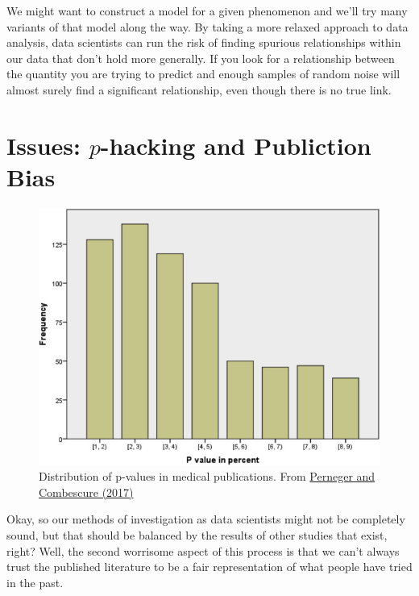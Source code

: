 \documentclass[
  12pt,
]{book}
\begin{document}
We might want to construct a model for a given phenomenon and we'll try many variants of that model along the way. By taking a more relaxed approach to data analysis, data scientists can run the risk of finding spurious relationships within our data that don't hold more generally. If you look for a relationship between the quantity you are trying to predict and enough samples of random noise will almost surely find a significant relationship, even though there is no true link.

\hypertarget{issues-p-hacking-and-publiction-bias}{%
\section{\texorpdfstring{Issues: \(p\)-hacking and Publiction Bias}{Issues: p-hacking and Publiction Bias}}\label{issues-p-hacking-and-publiction-bias}}

\begin{figure}
\centering
\includegraphics{images/401-production-reproducibility/p-values-in-medical-papers.jpg}
\caption{Distribution of p-values in medical publications. From \href{https://doi.org/10.1016/j.jclinepi.2017.04.003}{Perneger and Combescure (2017)}}
\end{figure}

Okay, so our methods of investigation as data scientists might not be completely sound, but that should be balanced by the results of other studies that exist, right? Well, the second worrisome aspect of this process is that we can't always trust the published literature to be a fair representation of what people have tried in the past.
\end{document}
